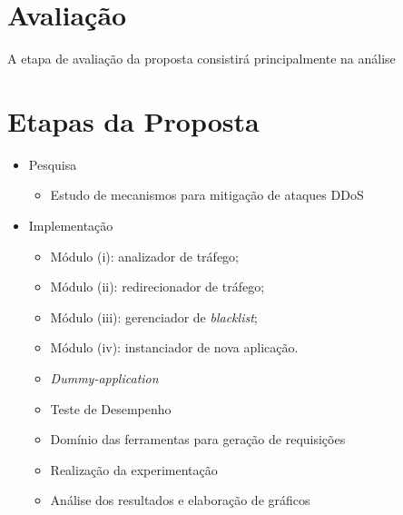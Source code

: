 \documentclass[a4paper, 11pt]{article}
\begin{document}


\section{Avalia\c{c}\~{a}o}
A etapa de avalia\c{c}\~{a}o da proposta consistirá principalmente na análise

\section{Etapas da Proposta}
\begin{itemize}
 \item Pesquisa
  \begin{itemize}
    \item Estudo de mecanismos para mitiga\c{c}\~{a}o de ataques DDoS
  \end{itemize}

 \item Implementa\c{c}\~{a}o
  \begin{itemize}
       \item Módulo (i): analizador de tráfego;
\item Módulo (ii): redirecionador de tráfego;
\item Módulo (iii): gerenciador de \emph{blacklist};
\item Módulo (iv): instanciador de nova aplica\c{c}\~{a}o.
\item \emph{Dummy-application}
 \item Teste de Desempenho
\item Domínio das ferramentas para geração de requisições
\item Realização da experimentação
\item Análise dos resultados e elaboração de gráficos
  \end{itemize}
\end{itemize}




\end{document}
